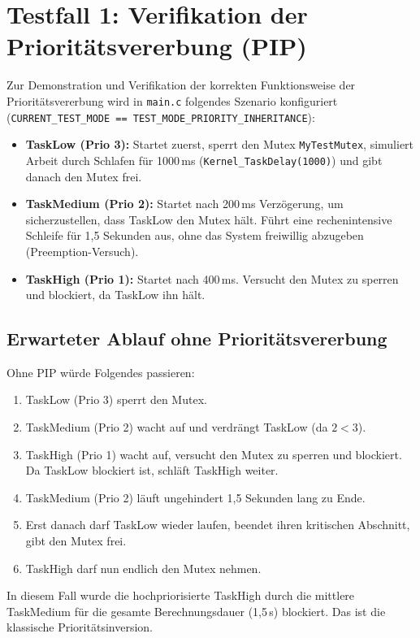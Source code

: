 \section{Testfall 1: Verifikation der Prioritätsvererbung (PIP)}
Zur Demonstration und Verifikation der korrekten Funktionsweise der Prioritätsvererbung wird in \lstinline|main.c| folgendes Szenario konfiguriert (\lstinline|CURRENT_TEST_MODE == TEST_MODE_PRIORITY_INHERITANCE|):

\begin{itemize}
    \item \textbf{TaskLow (Prio 3):} Startet zuerst, sperrt den Mutex \lstinline|MyTestMutex|, simuliert Arbeit durch Schlafen für 1000\,ms (\lstinline|Kernel_TaskDelay(1000)|) und gibt danach den Mutex frei.
    \item \textbf{TaskMedium (Prio 2):} Startet nach 200\,ms Verzögerung, um sicherzustellen, dass TaskLow den Mutex hält. Führt eine rechenintensive Schleife für 1,5 Sekunden aus, ohne das System freiwillig abzugeben (Preemption-Versuch).
    \item \textbf{TaskHigh (Prio 1):} Startet nach 400\,ms. Versucht den Mutex zu sperren und blockiert, da TaskLow ihn hält.
\end{itemize}

\subsection{Erwarteter Ablauf ohne Prioritätsvererbung}
Ohne PIP würde Folgendes passieren:
\begin{enumerate}
    \item TaskLow (Prio 3) sperrt den Mutex.
    \item TaskMedium (Prio 2) wacht auf und verdrängt TaskLow (da $2 < 3$).
    \item TaskHigh (Prio 1) wacht auf, versucht den Mutex zu sperren und blockiert. Da TaskLow blockiert ist, schläft TaskHigh weiter.
    \item TaskMedium (Prio 2) läuft ungehindert 1,5 Sekunden lang zu Ende.
    \item Erst danach darf TaskLow wieder laufen, beendet ihren kritischen Abschnitt, gibt den Mutex frei.
    \item TaskHigh darf nun endlich den Mutex nehmen.
\end{enumerate}
In diesem Fall wurde die hochpriorisierte TaskHigh durch die mittlere TaskMedium für die gesamte Berechnungsdauer (1,5\,s) blockiert. Das ist die klassische Prioritätsinversion.

